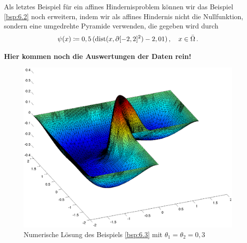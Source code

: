 \begin{bsp}\label{bsp:6.3}
Als letztes Beispiel für ein affines Hindernisproblem können wir das Beispiel \ref{bsp:6.2} noch erweitern, indem wir als affines Hindernis nicht die Nullfunktion, sondern eine umgedrehte Pyramide verwenden, die gegeben wird durch
\[
	\psi (x) \coloneqq 0,5 \,  (\operatorname{dist} (x,\partial [-2,2]^2)-2,01) \, , \quad x \in \bar \Omega \, .
\]

\textbf{Hier kommen noch die Auswertungen der Daten rein!}


\begin{figure}[h]
\begin{center}
\includegraphics[width=13cm]{Abbildungen/num_loesung_rec8_bsp3_angle1_ohneBalken.ps}
\end{center}
\caption{Numerische Lösung des Beispiels \ref{bsp:6.3} mit $\theta_1=\theta_2 = 0,3$}
\end{figure}



\end{bsp}
